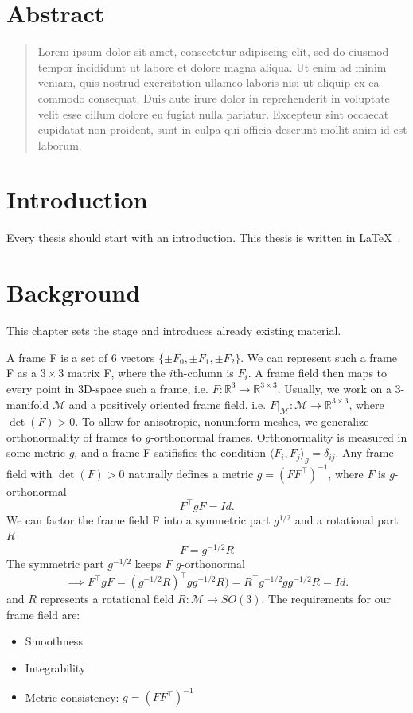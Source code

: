 \documentclass[a4paper,twoside,openright,11pt]{report}
\begin{document}
\chapter*{\centering Abstract}
\begin{quote}\noindent
  Lorem ipsum dolor sit amet, consectetur adipiscing elit, sed do eiusmod
  tempor incididunt ut labore et dolore magna aliqua. Ut enim ad minim
  veniam, quis nostrud exercitation ullamco laboris nisi ut aliquip ex ea
  commodo consequat. Duis aute irure dolor in reprehenderit in voluptate
  velit esse cillum dolore eu fugiat nulla pariatur. Excepteur sint
  occaecat cupidatat non proident, sunt in culpa qui officia deserunt
  mollit anim id est laborum.
\end{quote}

\cleardoublepage


\tableofcontents


\cleardoublepage



\chapter{Introduction}
\label{ch:intro}

Every thesis should start with an introduction.  This thesis is written
in \LaTeX~\cite{DBLP:books/daglib/0023602}.

  
\chapter{Background}

This chapter sets the stage and introduces already existing material.

A frame F is a set of 6 vectors $\{\pm F_0, \pm F_1, \pm F_2 \}$.
We can represent such a frame F as a $3\times3$ matrix F, where the $i$th-column is $F_i$.
A frame field then maps to every point in 3D-space such a frame, i.e. $F: \mathbb{R}^3 \to \mathbb{R}^{3\times3}$.
Usually, we work on a 3-manifold $\mathcal{M}$ and a positively oriented frame field, i.e.
$F\vert_{\mathcal{M}}: \mathcal{M} \to \mathbb{R}^{3\times3}$, where $\det(F)>0$.
To allow for anisotropic, nonuniform meshes, we generalize orthonormality of frames to
$g$-orthonormal frames. Orthonormality is measured in some metric $g$, and a frame F satifisfies the condition
$\langle F_i, F_j \rangle _g = \delta_{ij}$.
Any frame field with $\det(F)>0$ naturally defines a metric $g= (FF^{\top})^{-1}$, where $F$ is $g$-orthonormal
$$F^{\top}gF = Id.$$
We can factor the frame field F into a symmetric part $g^{1/2}$ and a rotational part $R$
$$F = g^{-1/2}R$$
The symmetric part $g^{-1/2}$ keeps $F$ $g$-orthonormal
$$ \implies F^{\top}gF = (g^{-1/2}R)^{\top}gg^{-1/2}R)=R^{\top}g^{-1/2}gg^{-1/2}R =Id.$$
and $R$ represents a rotational field $R: \mathcal{M} \to SO(3)$.
The requirements for our frame field are:
\begin{itemize}
  \item Smoothness
  \item Integrability
  \item Metric consistency: $g = (FF^{\top})^{-1}$
\end{itemize}
\end{document}
